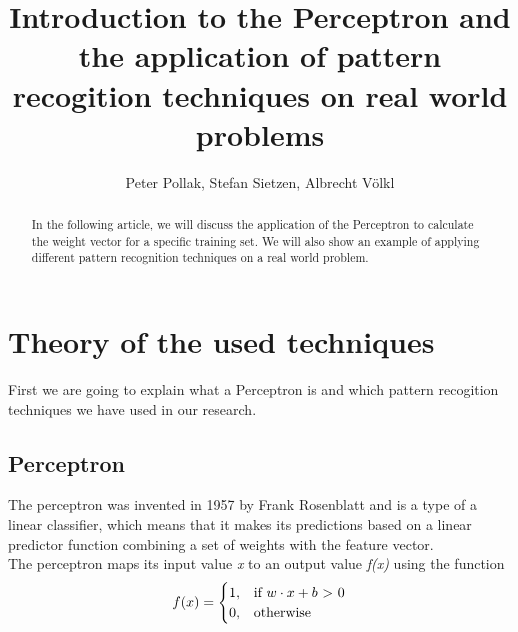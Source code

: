 \documentclass{article}
\begin{document}
\title{Introduction to the Perceptron and the application of pattern recogition techniques on real world problems}
\author{Peter Pollak, Stefan Sietzen, Albrecht Völkl}

\maketitle

\begin{abstract}
In the following article, we will discuss the application of the Perceptron to calculate the weight vector for a specific training set. We will also show an example of applying different pattern recognition techniques on a real world problem.
\end{abstract}


\section{Theory of the used techniques}

First we are going to explain what a Perceptron is and which pattern recogition techniques we have used in our research.

\subsection{Perceptron}

The perceptron was invented in 1957 by Frank Rosenblatt and is a type of a linear classifier, which means that it makes its predictions based on a linear predictor function combining a set of weights with the feature vector. 
\\The perceptron maps its input value \emph{x} to an output value \emph{f(x)} using the function
\\


\begin{equation}
f(x) = \begin{cases} 
    1, & \mbox{if } w \cdot x+b \mbox{ \textgreater \ 0} 
    \\ 
    0, & \mbox{otherwise }
\end{cases}
\end{equation}
\\
\end{document}

